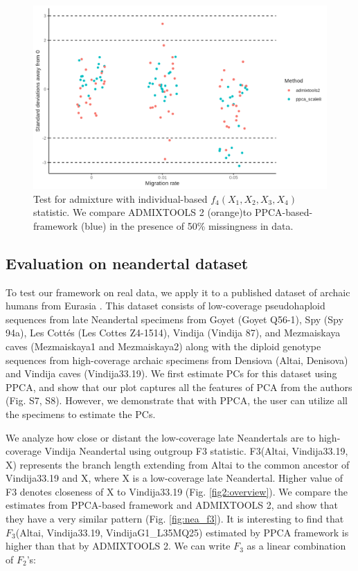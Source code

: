 \documentclass[12pt, letterpaper]{article}
\begin{document}
\begin{figure}[ht!]
    \includegraphics[width=16.5cm]{plots/simfiles/AvgFolder/Ne1000/split_times1000/npop10_nind100/missing0.5/plots_8/hypothesis_test_comparison.png}
    \centering
         \caption{Test for admixture with individual-based $f_4(X_1, X_2, X_3, X_4)$ statistic. We compare ADMIXTOOLS 2 (orange)to PPCA-based-framework (blue) in the presence of 50\% missingness in data.}
    \label{fig:admixture}
\end{figure}

\subsection{Evaluation on neandertal dataset}

To test our framework on real data, we apply it to a published dataset of archaic humans from Eurasia \cite{hajdinjak}. This dataset consists of low-coverage pseudohaploid sequences from late Neandertal specimens from Goyet (Goyet Q56-1), Spy (Spy 94a), Les Cottés (Les Cottes Z4-1514), Vindija (Vindija 87), and Mezmaiskaya caves (Mezmaiskaya1 and Mezmaiskaya2) along with the diploid genotype sequences from high-coverage archaic specimens from Densiova (Altai, Denisova) and Vindija caves (Vindija33.19). We first estimate PCs for this dataset using PPCA, and show that our plot captures all the features of PCA from the authors (Fig. S7, S8). However, we demonstrate that with PPCA, the user can utilize all the specimens to estimate the PCs. 

We analyze how close or distant the low-coverage late Neandertals are to high-coverage Vindija Neandertal using outgroup F3 statistic. F3(Altai, Vindija33.19, X) represents the branch length extending from Altai to the common ancestor of Vindija33.19 and X, where X is a low-coverage late Neandertal. Higher value of F3 denotes closeness of X to Vindija33.19 (Fig. \ref{fig2:overview}). We compare the estimates from PPCA-based framework and ADMIXTOOLS 2, and show that they have a very similar pattern (Fig. \ref{fig:nea_f3}). It is interesting to find that $F_3$(Altai, Vindija33.19, VindijaG1\_L35MQ25) estimated by PPCA framework is higher than that by ADMIXTOOLS 2. We can write $F_3$ as a linear combination of $F_2$'s:
\end{document}
